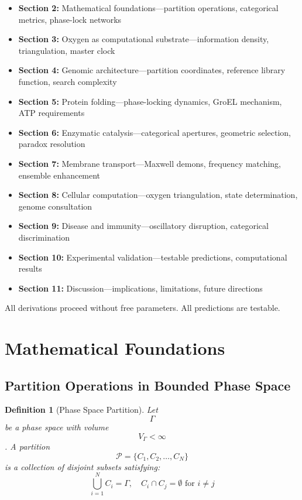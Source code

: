 \documentclass[12pt,a4paper]{article}
\newtheorem{definition}{Definition}
\begin{document}
\begin{itemize}
\item \textbf{Section 2:} Mathematical foundations—partition operations, categorical metrics, phase-lock networks
\item \textbf{Section 3:} Oxygen as computational substrate—information density, triangulation, master clock
\item \textbf{Section 4:} Genomic architecture—partition coordinates, reference library function, search complexity
\item \textbf{Section 5:} Protein folding—phase-locking dynamics, GroEL mechanism, ATP requirements
\item \textbf{Section 6:} Enzymatic catalysis—categorical apertures, geometric selection, paradox resolution
\item \textbf{Section 7:} Membrane transport—Maxwell demons, frequency matching, ensemble enhancement
\item \textbf{Section 8:} Cellular computation—oxygen triangulation, state determination, genome consultation
\item \textbf{Section 9:} Disease and immunity—oscillatory disruption, categorical discrimination
\item \textbf{Section 10:} Experimental validation—testable predictions, computational results
\item \textbf{Section 11:} Discussion—implications, limitations, future directions
\end{itemize}

All derivations proceed without free parameters. All predictions are testable.

\section{Mathematical Foundations}

\subsection{Partition Operations in Bounded Phase Space}

\begin{definition}[Phase Space Partition]
Let $$\Gamma$$ be a phase space with volume $$V_\Gamma < \infty$$. A partition $$\mathcal{P} = \{C_1, C_2, \ldots, C_N\}$$ is a collection of disjoint subsets satisfying:
$$
\bigcup_{i=1}^N C_i = \Gamma, \quad C_i \cap C_j = \emptyset \text{ for } i \neq j
$$
\end{definition}
\end{document}
